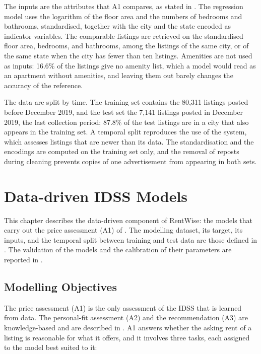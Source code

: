 \documentclass[12pt,a4paper]{report}
\begin{document}
The inputs are the attributes that A1 compares, as stated in
. The regression model uses the logarithm of the floor
area and the numbers of bedrooms and bathrooms, standardised, together with
the city and the state encoded as indicator variables. The comparable
listings are retrieved on the standardised floor area, bedrooms, and
bathrooms, among the listings of the same city, or of the same state when
the city has fewer than ten listings. Amenities are not used as inputs:
16.6\% of the listings give no amenity list, which a model would read as an
apartment without amenities, and leaving them out barely changes the
accuracy of the reference.

The data are split by time. The training set contains the 80,311 listings
posted before December 2019, and the test set the 7,141 listings posted in
December 2019, the last collection period; 87.8\% of the test listings are
in a city that also appears in the training set. A temporal split
reproduces the use of the system, which assesses listings that are newer
than its data. The standardisation and the encodings are computed on the
training set only, and the removal of reposts during cleaning prevents
copies of one advertisement from appearing in both sets.

\chapter{Data-driven IDSS Models}
\label{ch:datadriven}

This chapter describes the data-driven component of RentWise: the models
that carry out the price assessment (A1) of . The
modelling dataset, its target, its inputs, and the temporal split between
training and test data are those defined in .
The validation of the models and the calibration of their parameters are
reported in .

\section{Modelling Objectives}
\label{sec:modelling-objectives}

The price assessment (A1) is the only assessment of the IDSS that is learned
from data. The personal-fit assessment (A2) and the recommendation (A3) are
knowledge-based and are described in . A1 answers
whether the asking rent of a listing is reasonable for what it offers, and
it involves three tasks, each assigned to the model best suited to it:
\end{document}
